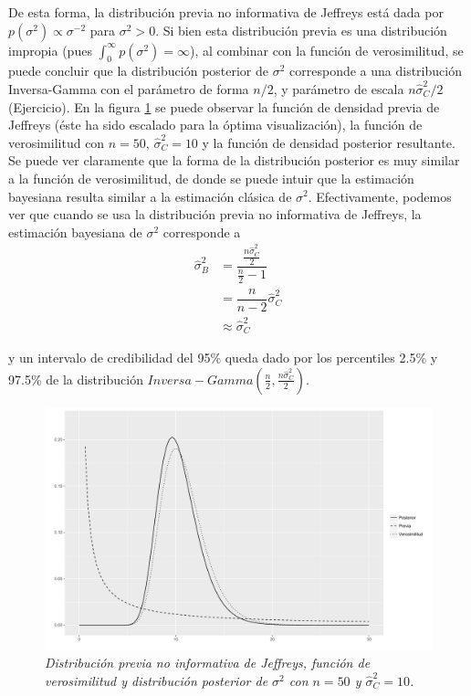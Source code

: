     De esta forma, la distribuci\'on previa no informativa de Jeffreys est\'a dada por $p(\sigma^2)\propto \sigma^{-2}$ para $\sigma^2>0$. Si bien esta distribuci\'on previa es una distribuci\'on impropia (pues $\int_0^\infty p(\sigma^2)=\infty$), al combinar con la funci\'on de verosimilitud, se puede concluir que la distribuci\'on posterior de $\sigma^2$ corresponde a una distribuci\'on Inversa-Gamma con el par\'ametro de forma $n/2$, y par\'ametro de escala $n\hat{\sigma}^2_C/2$ (Ejercicio). En la figura \ref{Posterior_Sigma2_Jeffreys} se puede observar la funci\'on de densidad previa de Jeffreys (\'este ha sido escalado para la \'optima visualizaci\'on), la funci\'on de verosimilitud con $n=50$, $\hat{\sigma}^2_C=10$ y la funci\'on de densidad posterior resultante. Se puede ver claramente que la forma de la distribuci\'on posterior es muy similar a la funci\'on de verosimilitud, de donde se puede intuir que la estimaci\'on bayesiana resulta similar a la estimaci\'on cl\'asica de $\sigma^2$. Efectivamente, podemos ver que cuando se usa la distribuci\'on previa no informativa de Jeffreys, la estimaci\'on bayesiana de $\sigma^2$ corresponde a 
    \begin{align*}
    \hat{\sigma}^2_B&=\dfrac{\frac{n\hat{\sigma}^2_C}{2}}{\frac{n}{2}-1}\\
    &=\dfrac{n}{n-2}\hat{\sigma}^2_C\\
    &\approx \hat{\sigma}^2_C
    \end{align*}
    
    y un intervalo de credibilidad del 95\% queda dado por los percentiles 2.5\% y 97.5\% de la distribuci\'on $Inversa-Gamma(\frac{n}{2},\frac{n\hat{\sigma}^2_C}{2})$.
    
    \begin{figure}[!h]
    \centering
    \includegraphics[scale=0.4]{Sigma2_Jeffreys.pdf}
    \caption{\emph{Distribuci\'on previa no informativa de Jeffreys, funci\'on de verosimilitud y distribuci\'on posterior de $\sigma^2$ con $n=50$ y $\hat{\sigma}^2_C=10$.}}
    \label{Posterior_Sigma2_Jeffreys}
    \end{figure}
    
